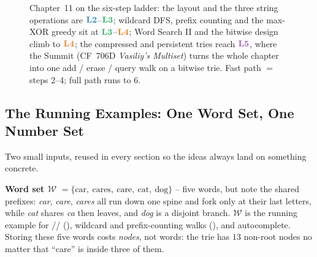 \begin{figure}[H]
\centering
{}
\caption*{Chapter~11 on the six-step ladder: the layout and the three string operations are
$\lv2$--$\lv3$; wildcard DFS, prefix counting and the max-XOR greedy sit at $\lv3$--$\lv4$; Word
Search II and the bitwise design climb to $\lv4$; the compressed and persistent tries reach $\lv5$,
where the Summit (CF~706D \emph{Vasiliy's Multiset}) turns the whole chapter into one add / erase /
query walk on a bitwise trie. Fast path $=$ steps 2--4; full path runs to 6.}
\end{figure}

\subsection*{The Running Examples: One Word Set, One Number Set}

Two small inputs, reused in every section so the ideas always land on something concrete.

\textbf{Word set $\mathcal{W}$} $= \{\text{car},\ \text{cares},\ \text{care},\ \text{cat},\ \text{dog}\}$
-- five words, but note the shared prefixes: \emph{car}, \emph{care}, \emph{cares} all run down one
spine and fork only at their last letters, while \emph{cat} shares \emph{ca} then leaves, and \emph{dog}
is a disjoint branch. $\mathcal{W}$ is the running example for //
 (), wildcard and prefix-counting walks
(), and autocomplete. Storing these five words costs \emph{nodes}, not words:
the trie has $13$ non-root nodes no matter that ``care'' is inside three of them.

